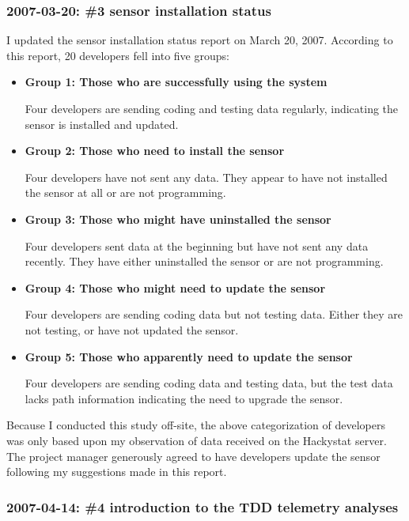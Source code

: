 \subsubsection{2007-03-20: \#3 sensor installation status}
I updated the sensor installation status report on March 20, 2007. According to this report, 20 developers fell into five groups:
\begin{itemize}
\item {\textbf{Group 1: Those who are successfully using the system}}

Four developers are sending coding and testing data regularly, indicating the sensor is installed and updated.

\item {\textbf{Group 2: Those who need to install the sensor}}

Four developers have not sent any data. They appear to have not installed the sensor at all or are not programming.

\item {\textbf{Group 3: Those who might have uninstalled the sensor}}

Four developers sent data at the beginning but have not sent any data recently. They have either uninstalled the sensor or are not programming.

\item {\textbf{Group 4: Those who might need to update the sensor}}

Four developers are sending coding data but not testing data. Either they are not testing, or have not updated the sensor.

\item {\textbf{Group 5: Those who apparently need to update the sensor}}

Four developers are sending coding data and testing data, but the test data lacks path information indicating the need to upgrade the sensor.

\end{itemize}

Because I conducted this study off-site, the above categorization of developers was only based upon my observation of data received on the Hackystat server. The project manager generously agreed to have developers update the sensor following my suggestions made in this report.  

\subsubsection{2007-04-14: \#4 introduction to the TDD telemetry analyses}

